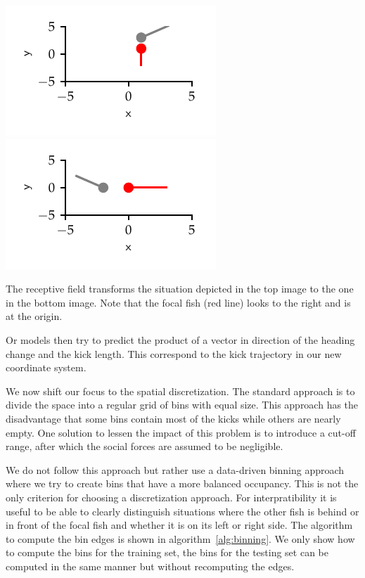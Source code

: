 \documentclass[nobib, a4paper]{tufte-handout}
\begin{document}
\begin{marginfigure}
 \includegraphics{receptive_field_before} 
 \includegraphics[scale=1]{receptive_field_after} 
 \caption{The receptive field transforms the situation depicted in the top image to the one in the bottom image.
 Note that the focal fish (red line) looks to the right and is at the origin.}
\label{fig:rf}
\end{marginfigure}

Or models then try to predict the product of a vector in direction of the heading change and the kick length.
This correspond to the kick trajectory in our new coordinate system.

We now shift our focus to the spatial discretization.
The standard approach is to divide the space into a regular grid of bins with equal size.
This approach has the disadvantage that some bins contain most of the kicks while others are nearly empty.
One solution to lessen the impact of this problem is to introduce a cut-off range, after which the social forces are assumed to be negligible.

We do not follow this approach but rather use a data-driven binning approach where we try to create bins that have a more balanced occupancy.
This is not the only criterion for choosing a discretization approach.
For interpratibility it is useful to be able to clearly distinguish situations where the other fish is behind or in front of the focal fish and whether it is on its left or right side.
The algorithm to compute the bin edges is shown in algorithm~\ref{alg:binning}.
We only show how to compute the bins for the training set, the bins for the testing set can be computed in the same manner but without recomputing the edges.
\end{document}

